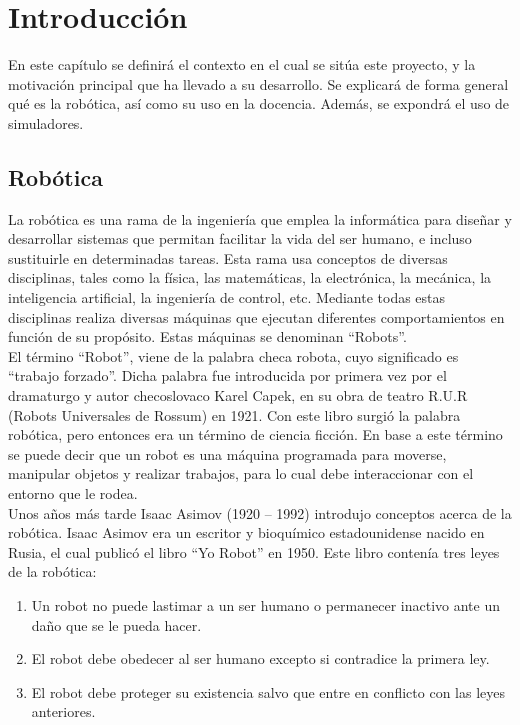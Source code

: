 \chapter{Introducción}\label{cap.introduccion}
En este capítulo se definirá el contexto en el cual se sitúa este proyecto, y la motivación principal que ha llevado a su desarrollo. Se explicará de forma general qué es la robótica, así como su uso en la docencia. Además, se expondrá el uso de simuladores.

\section{Robótica}

La robótica es una rama de la ingeniería que emplea la informática para diseñar y desarrollar sistemas que permitan facilitar la vida del ser humano, e incluso sustituirle en determinadas tareas. Esta rama usa conceptos de diversas disciplinas, tales como la física, las matemáticas, la electrónica, la mecánica, la inteligencia artificial, la ingeniería de control, etc. Mediante todas estas disciplinas realiza diversas máquinas que ejecutan diferentes comportamientos en función de su propósito. Estas máquinas se denominan ``Robots''.\\

El término ``Robot'', viene de la palabra checa robota, cuyo significado es ``trabajo forzado''. Dicha palabra fue introducida por primera vez por el dramaturgo y autor checoslovaco Karel Capek, en su obra de teatro R.U.R (Robots Universales de Rossum) en 1921. Con este libro surgió la palabra robótica, pero entonces era un término de ciencia ficción. En base a este término se puede decir que un robot es una máquina programada para moverse, manipular objetos y realizar trabajos, para lo cual debe interaccionar con el entorno que le rodea.\\

Unos años más tarde Isaac Asimov (1920 -- 1992) introdujo conceptos acerca de la robótica. Isaac Asimov era un escritor y bioquímico estadounidense nacido en Rusia, el cual publicó el libro ``Yo Robot'' en 1950. Este libro contenía tres leyes de la robótica:

\begin{enumerate}[1.]
    \item Un robot no puede lastimar a un ser humano o permanecer inactivo ante un daño que se le pueda hacer.
    \item El robot debe obedecer al ser humano excepto si contradice la primera ley.
    \item El robot debe proteger su existencia salvo que entre en conflicto con las leyes anteriores.
\end{enumerate}

